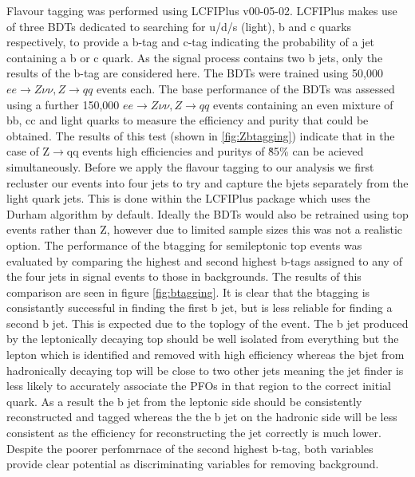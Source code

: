 Flavour tagging was performed using LCFIPlus v00-05-02\cite{Suehara:2015ura}. LCFIPlus makes use of three BDTs dedicated to searching for u/d/s (light), b and c quarks respectively, to provide a b-tag and c-tag indicating the probability of a jet containing a b or c quark. As the signal process contains two b jets, only the results of the b-tag are considered here. The BDTs were trained using 50,000 $ee\rightarrow Z\nu\nu, Z\rightarrow qq$ events each. The base performance of the BDTs was assessed using a further 150,000 $ee\rightarrow Z\nu\nu, Z\rightarrow qq$ events containing an even mixture of bb, cc and light quarks to measure the efficiency and purity that could be obtained. The results of this test (shown in \ref{fig:Zbtagging}) indicate that in the case of Z$\rightarrow$qq events high efficiencies and puritys of \~85\% can be acieved simultaneously. Before we apply the flavour tagging to our analysis we first recluster our events into four jets to try and capture the bjets separately from the light quark jets. This is done within the LCFIPlus package which uses the Durham algorithm by default. Ideally the BDTs would also be retrained using top events rather than Z, however due to limited sample sizes this was not a realistic option. The performance of the btagging for semileptonic top events was evaluated by comparing the highest and second highest b-tags assigned to any of the four jets in signal events to those in backgrounds. The results of this comparison are seen in figure \ref{fig:btagging}. It is clear that the btagging is consistantly successful in finding the first b jet, but is less reliable for finding a second b jet. This is expected due to the toplogy of the event. The b jet produced by the leptonically decaying top should be well isolated from everything but the lepton which is identified and removed with high efficiency whereas the bjet from hadronically decaying top will be close to two other jets meaning the jet finder is less likely to accurately associate the PFOs in that region to the correct initial quark. As a result the b jet from the leptonic side should be consistently reconstructed and tagged whereas the the b jet on the hadronic side will be less consistent as the efficiency for reconstructing the jet correctly is much lower. Despite the poorer perfomrnace of the second highest b-tag, both variables provide clear potential as discriminating variables for removing background. 


